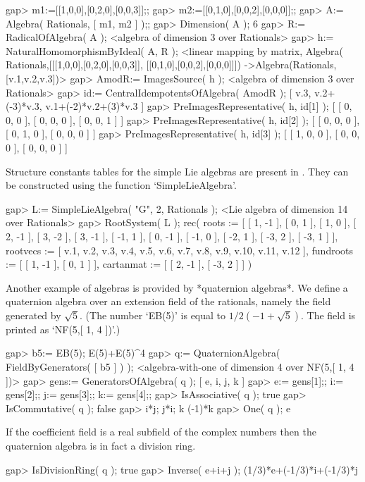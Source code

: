 \beginexample
gap> m1:=[[1,0,0],[0,2,0],[0,0,3]];;
gap> m2:=[[0,1,0],[0,0,2],[0,0,0]];;
gap> A:= Algebra( Rationals, [ m1, m2 ] );;
gap> Dimension( A );
6
\endexample
\beginexample
gap> R:= RadicalOfAlgebra( A );
<algebra of dimension 3 over Rationals>
gap> h:= NaturalHomomorphismByIdeal( A, R );
<linear mapping by matrix, 
  Algebra( Rationals,[[[1,0,0],[0,2,0],[0,0,3]], [[0,1,0],[0,0,2],[0,0,0]]])
  ->Algebra(Rationals,[v.1,v.2,v.3])>
\endexample
\beginexample
gap> AmodR:= ImagesSource( h );
<algebra of dimension 3 over Rationals>
gap> id:= CentralIdempotentsOfAlgebra( AmodR );
[ v.3, v.2+(-3)*v.3, v.1+(-2)*v.2+(3)*v.3 ]
gap> PreImagesRepresentative( h, id[1] );
[ [ 0, 0, 0 ], [ 0, 0, 0 ], [ 0, 0, 1 ] ]
gap> PreImagesRepresentative( h, id[2] );
[ [ 0, 0, 0 ], [ 0, 1, 0 ], [ 0, 0, 0 ] ]
gap> PreImagesRepresentative( h, id[3] );
[ [ 1, 0, 0 ], [ 0, 0, 0 ], [ 0, 0, 0 ] ]
\endexample

Structure constants tables for the simple Lie algebras are present in {\GAP}.
They can be constructed using the function `SimpleLieAlgebra'.

\beginexample
gap> L:= SimpleLieAlgebra( "G", 2, Rationals );
<Lie algebra of dimension 14 over Rationals>
gap> RootSystem( L );
rec(
  roots := [ [ 1, -1 ], [ 0, 1 ], [ 1, 0 ], [ 2, -1 ], [ 3, -2 ], [ 3, -1 ], 
      [ -1, 1 ], [ 0, -1 ], [ -1, 0 ], [ -2, 1 ], [ -3, 2 ], [ -3, 1 ] ],
  rootvecs := [ v.1, v.2, v.3, v.4, v.5, v.6, v.7, v.8, v.9, v.10, v.11, v.12 
     ],
  fundroots := [ [ 1, -1 ], [ 0, 1 ] ],
  cartanmat := [ [ 2, -1 ], [ -3, 2 ] ] )
\endexample

Another example of algebras is provided by *quaternion algebras*.
We define a quaternion algebra over an extension field of the
rationals, namely the field generated by $\sqrt{5}$.
(The number `EB(5)' is equal to $1/2 (-1+\sqrt{5})$.
The field is printed as `NF(5,[ 1, 4 ])'.)

\beginexample
gap> b5:= EB(5);
E(5)+E(5)^4
gap> q:= QuaternionAlgebra( FieldByGenerators( [ b5 ] ) );
<algebra-with-one of dimension 4 over NF(5,[ 1, 4 ])>
gap> gens:= GeneratorsOfAlgebra( q );
[ e, i, j, k ]
gap> e:= gens[1];; i:= gens[2];; j:= gens[3];; k:= gens[4];;
gap> IsAssociative( q );
true
gap> IsCommutative( q );
false
gap> i*j; j*i;
k
(-1)*k
gap> One( q );
e
\endexample

If the coefficient field is a real subfield of the complex numbers
then the quaternion algebra is in fact a division ring.

\beginexample
gap> IsDivisionRing( q );
true
gap> Inverse( e+i+j );
(1/3)*e+(-1/3)*i+(-1/3)*j
\endexample

